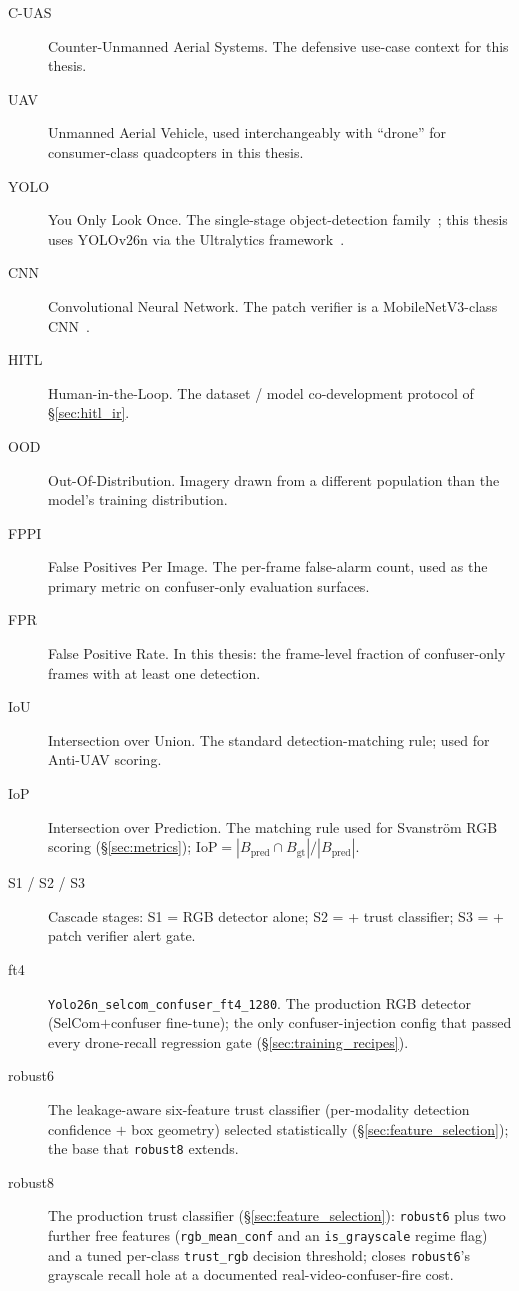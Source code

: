 \begin{description}
    \item[C-UAS] Counter-Unmanned Aerial Systems. The defensive use-case context for this thesis.
    \item[UAV] Unmanned Aerial Vehicle, used interchangeably with ``drone'' for consumer-class quadcopters in this thesis.
    \item[YOLO] You Only Look Once. The single-stage object-detection family~\cite{redmon2016yolo}; this thesis uses YOLOv26n via the Ultralytics framework~\cite{ultralytics2024}.
    \item[CNN] Convolutional Neural Network. The patch verifier is a MobileNetV3-class CNN~\cite{howard2019mobilenetv3}.
    \item[HITL] Human-in-the-Loop. The dataset / model co-development protocol of \S\ref{sec:hitl_ir}.
    \item[OOD] Out-Of-Distribution. Imagery drawn from a different population than the model's training distribution.
    \item[FPPI] False Positives Per Image. The per-frame false-alarm count, used as the primary metric on confuser-only evaluation surfaces.
    \item[FPR] False Positive Rate. In this thesis: the frame-level fraction of confuser-only frames with at least one detection.
    \item[IoU] Intersection over Union. The standard detection-matching rule; used for Anti-UAV scoring.
    \item[IoP] Intersection over Prediction. The matching rule used for Svanstr\"om RGB scoring (\S\ref{sec:metrics}); $\text{IoP} = |B_\text{pred} \cap B_\text{gt}| / |B_\text{pred}|$.
    \item[S1 / S2 / S3] Cascade stages: S1 = RGB detector alone; S2 = + trust classifier; S3 = + patch verifier alert gate.
    \item[ft4] \texttt{Yolo26n\_selcom\_confuser\_ft4\_1280}. The production RGB detector (SelCom$+$confuser fine-tune); the only confuser-injection config that passed every drone-recall regression gate (\S\ref{sec:training_recipes}).
    \item[robust6] The leakage-aware six-feature trust classifier (per-modality detection confidence $+$ box geometry) selected statistically (\S\ref{sec:feature_selection}); the base that \texttt{robust8} extends.
    \item[robust8] The production trust classifier (\S\ref{sec:feature_selection}): \texttt{robust6} plus two further free features (\texttt{rgb\_mean\_conf} and an \texttt{is\_grayscale} regime flag) and a tuned per-class \texttt{trust\_rgb} decision threshold; closes \texttt{robust6}'s grayscale recall hole at a documented real-video-confuser-fire cost.

\end{description}
